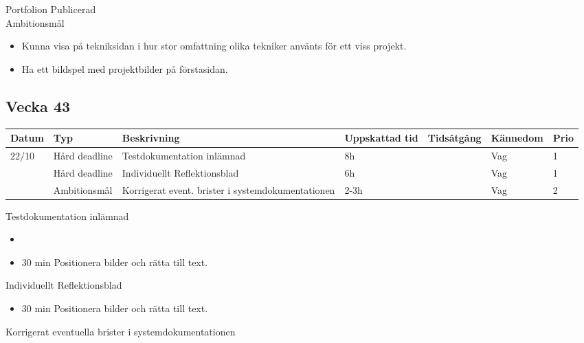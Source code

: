 \documentclass{TDP003mall}
\begin{document}
Portfolion Publicerad\\


Ambitionsmål
\begin{itemize}
  \item Kunna visa på tekniksidan i hur stor omfattning olika tekniker använts för ett viss projekt.
  \item Ha ett bildspel med projektbilder på förstasidan.
\end{itemize}

\subsection{Vecka 43}
\begin{tabularx}{\linewidth}{|l|l|X|l|l|l|l|}
	\hline
	Datum & Typ           & Beskrivning                                       & Uppskattad tid & Tidsåtgång & Kännedom & Prio \\ [0.5ex]
	\hline                                                                             
	22/10 & Hård deadline & Testdokumentation inlämnad                        & 8h             &            & Vag      & 1    \\
	\hline                                                                             
          & Hård deadline & Individuellt Reflektionsblad                      & 6h             &            & Vag      & 1    \\
	\hline                                                                             
          & Ambitionsmål  & Korrigerat event. brister i systemdokumentationen & 2-3h           &            & Vag      & 2    \\
	\hline
\end{tabularx}

Testdokumentation inlämnad\\
\begin{itemize}
  \item 
  \item 30 min Positionera bilder och rätta till text.
\end{itemize}

Individuellt Reflektionsblad\\
\begin{itemize}
  \item 30 min Positionera bilder och rätta till text.
  \end{itemize}
  
Korrigerat eventuella brister i systemdokumentationen\\
\end{document}
